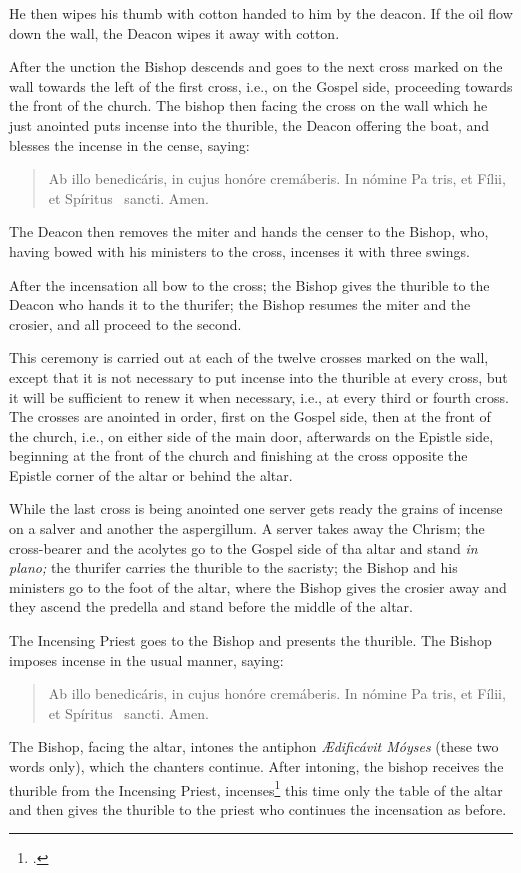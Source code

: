 \documentclass[letterpaper]{report}
\newcommand\blessincense{
\begin{quote}
   Ab illo benedicáris, in cujus honóre cremáberis. In nómine Pa\cross
    tris, et Fí\cross lii, et Spíritus \cross\ sancti. \rbar Amen.
\end{quote}
}
\begin{document}
{    He then wipes his thumb with cotton handed to him by the deacon. If the oil
    flow down the wall, the Deacon wipes it away with cotton.

    \rubric After the unction the Bishop descends and goes to the next cross
    marked on the wall towards the left of the first cross, i.e., on the
    Gospel side, proceeding towards the front of the church. The bishop then
    facing the cross on the wall which he just anointed puts incense into the
    thurible, the Deacon offering the boat, and blesses the incense in the
    cense, saying: 

    \blessincense

    The Deacon then removes the miter and hands the censer to the Bishop, who,
    having bowed with his ministers to the cross, incenses it with three
    swings.

    After the incensation all bow to the cross; the Bishop gives the thurible
    to the Deacon who hands it to the thurifer; the Bishop resumes the miter
    and the crosier, and all proceed to the second. 
    
    \rubric This ceremony is carried out at each of the twelve crosses marked
    on the wall, except that it is not necessary to put incense into the
    thurible at every cross, but it will be sufficient to renew it when
    necessary, i.e., at every third or fourth cross. The crosses are anointed
    in order, first on the Gospel side, then at the front of the church, i.e.,
    on either side of the main door, afterwards on the Epistle side, beginning
    at the front of the church and finishing at the cross opposite the Epistle
    corner of the altar or behind the altar.

    \rubric While the last cross is being anointed one server gets ready the
    grains of incense on a salver and another the aspergillum. A server takes
    away the Chrism; the cross-bearer and the acolytes go to the Gospel side of
    tha altar and stand \textit{in plano;} the thurifer carries the thurible to
    the sacristy; the Bishop and his ministers go to the foot of the altar,
    where the Bishop gives the crosier away and they ascend the predella and
    stand before the middle of the altar.

    \rubric The Incensing Priest goes to the Bishop and presents the thurible.
    The Bishop imposes incense in the usual manner, saying:

    \blessincense

    The Bishop, facing the altar, intones the antiphon \textit{\AE dificávit
    Móyses} (these two words only), which the chanters continue. After
    intoning, the bishop receives the thurible from the Incensing Priest,
    incenses\footcite[ It seems that a single swing to the middle, one to the
    left, and one to the right suffices. ][]{consecranda:1956} this time only
    the table of the altar and then gives the thurible to the priest who
    continues the incensation as before.

}
\end{document}
